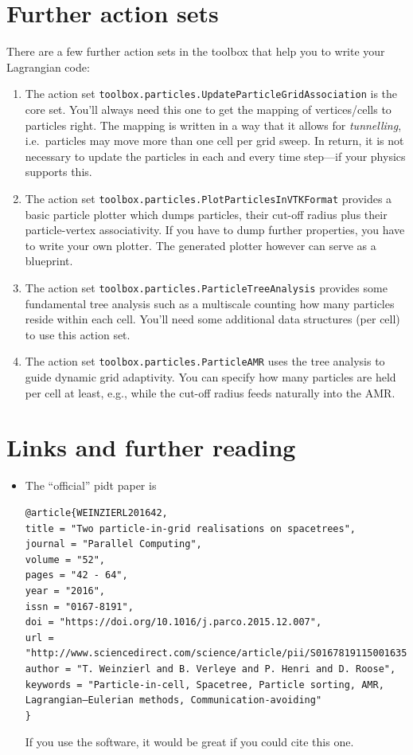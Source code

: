 \section{Further action sets}

There are a few further action sets in the toolbox that help you to write your
Lagrangian code:


\begin{enumerate}
  \item The action set \texttt{toolbox.particles.UpdateParticleGridAssociation}
  is the core set. You'll always need this one to get the mapping of
  vertices/cells to particles right. The mapping is written in a way that it
  allows for \emph{tunnelling}, i.e.~particles may move more than one cell per
  grid sweep. In return, it is not necessary to update the particles in each and
  every time step---if your physics supports this.
  \item The action set \texttt{toolbox.particles.PlotParticlesInVTKFormat}
  provides a basic particle plotter which dumps particles, their cut-off radius
  plus their particle-vertex associativity. If you have to dump further
  properties, you have to write your own plotter. The generated plotter however
  can serve as a blueprint.
  \item The action set \texttt{toolbox.particles.ParticleTreeAnalysis} provides
  some fundamental tree analysis such as a multiscale counting how many
  particles reside within each cell. You'll need some additional data structures
  (per cell) to use this action set.
  \item The action set \texttt{toolbox.particles.ParticleAMR} uses the tree
  analysis to guide dynamic grid adaptivity. You can specify how many particles
  are held per cell at least, e.g., while the cut-off radius feeds naturally
  into the AMR.
\end{enumerate}


\section*{Links and further reading}

\begin{itemize}
  \item The ``official'' pidt paper is
{\tiny \begin{verbatim}
@article{WEINZIERL201642,
title = "Two particle-in-grid realisations on spacetrees",
journal = "Parallel Computing",
volume = "52",
pages = "42 - 64",
year = "2016",
issn = "0167-8191",
doi = "https://doi.org/10.1016/j.parco.2015.12.007",
url = "http://www.sciencedirect.com/science/article/pii/S0167819115001635",
author = "T. Weinzierl and B. Verleye and P. Henri and D. Roose",
keywords = "Particle-in-cell, Spacetree, Particle sorting, AMR, Lagrangian–Eulerian methods, Communication-avoiding"
}  \end{verbatim}}
  If you use the software, it would be great if you could cite this one.
\end{itemize}


